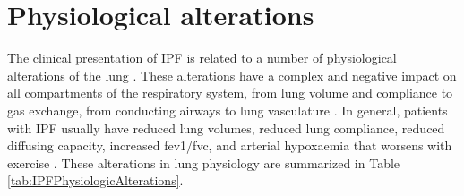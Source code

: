 \section{Physiological alterations}
The clinical presentation of IPF is related to a number of physiological alterations of the lung \citep{crystal1976idiopathic, plantier2018physiology}. These alterations have a complex and negative impact on all compartments of the respiratory system, from lung volume and compliance to gas exchange, from conducting airways to lung vasculature \citep{plantier2018physiology}. In general, patients with IPF usually have reduced lung volumes, reduced lung compliance, reduced diffusing capacity, increased \gls{fev1/fvc}, and arterial hypoxaemia that worsens with exercise \citep{crystal1976idiopathic,american2000idiopathic,cortes2014idiopathic,plantier2018physiology}. These alterations in lung physiology are summarized in Table \ref{tab:IPFPhysiologicAlterations}.


